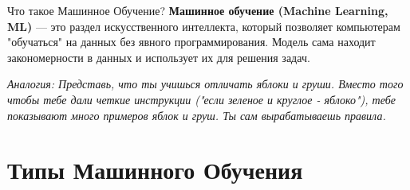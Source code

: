 
\begin{textbox}{Что такое Машинное Обучение?}
    \textbf{Машинное обучение (Machine Learning, ML)} — это раздел искусственного интеллекта, который позволяет компьютерам "обучаться" на данных без явного программирования. Модель сама находит закономерности в данных и использует их для решения задач.
    
    \textit{Аналогия: Представь, что ты учишься отличать яблоки и груши. Вместо того чтобы тебе дали четкие инструкции ("если зеленое и круглое - яблоко"), тебе показывают много примеров яблок и груш. Ты сам вырабатываешь правила.}
    \end{textbox}
    
    \section{Типы Машинного Обучения}
    
